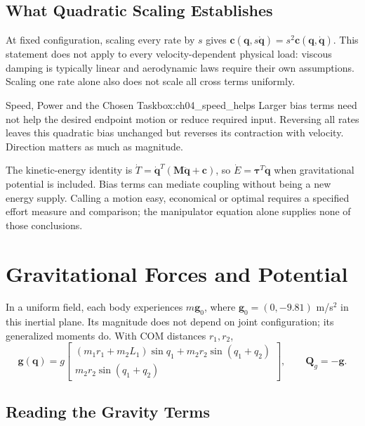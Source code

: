 \subsection*{What Quadratic Scaling Establishes}

At fixed configuration, scaling every rate by \(s\) gives \(\bm c(\bm q,s\dot{\bm q})=s^2\bm c(\bm q,\dot{\bm q})\). This statement does not apply to every velocity-dependent physical load: viscous damping is typically linear and aerodynamic laws require their own assumptions. Scaling one rate alone also does not scale all cross terms uniformly.

\begin{laymansbox}{Speed, Power and the Chosen Task}{box:ch04_speed_helps}
Larger bias terms need not help the desired endpoint motion or reduce required input. Reversing all rates leaves this quadratic bias unchanged but reverses its contraction with velocity. Direction matters as much as magnitude.

The kinetic-energy identity is \(\dot T=\dot{\bm q}^{T}(\bm M\ddot{\bm q}+\bm c)\), so \(\dot E=\bm\tau^T\dot{\bm q}\) when gravitational potential is included. Bias terms can mediate coupling without being a new energy supply. Calling a motion easy, economical or optimal requires a specified effort measure and comparison; the manipulator equation alone supplies none of those conclusions.
\end{laymansbox}

\section{Gravitational Forces and Potential}

In a uniform field, each body experiences \(m\bm g_0\), where \(\bm g_0=(0,-9.81)\) m/s\(^2\) in this inertial plane. Its magnitude does not depend on joint configuration; its generalized moments do. With COM distances \(r_1,r_2\),
\begin{equation}
\bm g(\bm q)=g\begin{bmatrix}
(m_1r_1+m_2L_1)\sin q_1+m_2r_2\sin(q_1+q_2)\\
m_2r_2\sin(q_1+q_2)
\end{bmatrix},\qquad \bm Q_g=-\bm g.
\label{eq:ch04_gravity}
\end{equation}

\subsection*{Reading the Gravity Terms}

